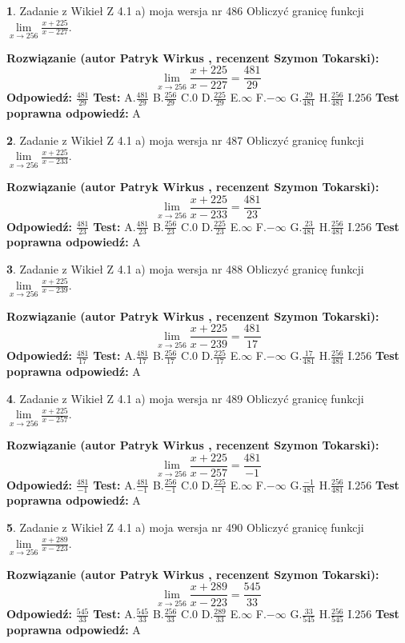 \documentclass[12pt, a4paper]{article}
\theoremstyle{definition} %
\newtheorem{zad}{}
\newcommand{\zadStart}[1]{\begin{zad}#1\newline}
\newcommand{\zadStop}{\end{zad}}
\newcommand{\rozwStart}[2]{\noindent \textbf{Rozwiązanie (autor #1 , recenzent #2): }\newline}
\newcommand{\rozwStop}{\newline}
\newcommand{\odpStart}{\noindent \textbf{Odpowiedź:}\newline}
\newcommand{\odpStop}{\newline}
\newcommand{\testStart}{\noindent \textbf{Test:}\newline}
\newcommand{\testStop}{\newline}
\newcommand{\kluczStart}{\noindent \textbf{Test poprawna odpowiedź:}\newline}
\newcommand{\kluczStop}{\newline}
\begin{document}
\zadStart{Zadanie z Wikieł Z 4.1 a) moja wersja nr 486}
Obliczyć granicę funkcji $\lim\limits_{x\to256}\frac{x+225}{x-227}$.
\zadStop
\rozwStart{Patryk Wirkus}{Szymon Tokarski}
$$\lim\limits_{x\to256}\frac{x+225}{x-227} = \frac{481}{29}$$
\rozwStop
\odpStart
$\frac{481}{29}$
\odpStop
\testStart
A.$\frac{481}{29}$
B.$\frac{256}{29}$
C.$0$
D.$\frac{225}{29}$
E.$\infty$
F.$-\infty$
G.$\frac{29}{481}$
H.$\frac{256}{481}$
I.$256$
\testStop
\kluczStart
A
\kluczStop



\zadStart{Zadanie z Wikieł Z 4.1 a) moja wersja nr 487}
Obliczyć granicę funkcji $\lim\limits_{x\to256}\frac{x+225}{x-233}$.
\zadStop
\rozwStart{Patryk Wirkus}{Szymon Tokarski}
$$\lim\limits_{x\to256}\frac{x+225}{x-233} = \frac{481}{23}$$
\rozwStop
\odpStart
$\frac{481}{23}$
\odpStop
\testStart
A.$\frac{481}{23}$
B.$\frac{256}{23}$
C.$0$
D.$\frac{225}{23}$
E.$\infty$
F.$-\infty$
G.$\frac{23}{481}$
H.$\frac{256}{481}$
I.$256$
\testStop
\kluczStart
A
\kluczStop



\zadStart{Zadanie z Wikieł Z 4.1 a) moja wersja nr 488}
Obliczyć granicę funkcji $\lim\limits_{x\to256}\frac{x+225}{x-239}$.
\zadStop
\rozwStart{Patryk Wirkus}{Szymon Tokarski}
$$\lim\limits_{x\to256}\frac{x+225}{x-239} = \frac{481}{17}$$
\rozwStop
\odpStart
$\frac{481}{17}$
\odpStop
\testStart
A.$\frac{481}{17}$
B.$\frac{256}{17}$
C.$0$
D.$\frac{225}{17}$
E.$\infty$
F.$-\infty$
G.$\frac{17}{481}$
H.$\frac{256}{481}$
I.$256$
\testStop
\kluczStart
A
\kluczStop



\zadStart{Zadanie z Wikieł Z 4.1 a) moja wersja nr 489}
Obliczyć granicę funkcji $\lim\limits_{x\to256}\frac{x+225}{x-257}$.
\zadStop
\rozwStart{Patryk Wirkus}{Szymon Tokarski}
$$\lim\limits_{x\to256}\frac{x+225}{x-257} = \frac{481}{-1}$$
\rozwStop
\odpStart
$\frac{481}{-1}$
\odpStop
\testStart
A.$\frac{481}{-1}$
B.$\frac{256}{-1}$
C.$0$
D.$\frac{225}{-1}$
E.$\infty$
F.$-\infty$
G.$\frac{-1}{481}$
H.$\frac{256}{481}$
I.$256$
\testStop
\kluczStart
A
\kluczStop



\zadStart{Zadanie z Wikieł Z 4.1 a) moja wersja nr 490}
Obliczyć granicę funkcji $\lim\limits_{x\to256}\frac{x+289}{x-223}$.
\zadStop
\rozwStart{Patryk Wirkus}{Szymon Tokarski}
$$\lim\limits_{x\to256}\frac{x+289}{x-223} = \frac{545}{33}$$
\rozwStop
\odpStart
$\frac{545}{33}$
\odpStop
\testStart
A.$\frac{545}{33}$
B.$\frac{256}{33}$
C.$0$
D.$\frac{289}{33}$
E.$\infty$
F.$-\infty$
G.$\frac{33}{545}$
H.$\frac{256}{545}$
I.$256$
\testStop
\kluczStart
A
\kluczStop
\end{document}
